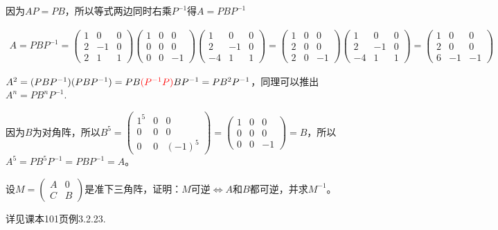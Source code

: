 \documentclass[a4paper]{report}
\begin{document}
\begin{jie}
因为$AP=PB$，所以等式两边同时右乘$P^{-1}$得$A=PBP^{-1}$

\begin{align*}
A=PBP^{-1}=
\begin{pmatrix}
1&0&0\\
2&-1&0\\
2&1&1
\end{pmatrix}
\begin{pmatrix}
1&0&0\\
0&0&0\\
0&0&-1
\end{pmatrix}
\begin{pmatrix}
1&0&0\\
2&-1&0\\
-4&1&1
\end{pmatrix}=
\begin{pmatrix}
1&0&0\\
2&0&0\\
2&0&-1
\end{pmatrix}
\begin{pmatrix}
1&0&0\\
2&-1&0\\
-4&1&1
\end{pmatrix}=
\begin{pmatrix}
1&0&0\\
2&0&0\\
6&-1&-1
\end{pmatrix}
\end{align*}

$A^2=
(PBP^{-1})(PBP^{-1})=PB\textcolor[rgb]{1.00,0.00,0.00}{(P^{-1}P)}BP^{-1}=PB^2P^{-1}
$，同理可以推出$A^n=PB^nP^{-1}$.

因为$B$为对角阵，所以$B^5
=\begin{pmatrix}
1^5&0&0\\
0&0&0\\
0&0&(-1)^5
 \end{pmatrix}=
 \begin{pmatrix}
 1&0&0\\
0&0&0\\
0&0&-1
 \end{pmatrix}=B
$，所以$A^5=PB^5P^{-1}=PBP^{-1}=A$。
\end{jie}

\EX 设$M=
\begin{pmatrix}
A&0\\
C&B
\end{pmatrix}
$是准下三角阵，证明：$M$可逆$\Leftrightarrow A$和$B$都可逆，并求$M^{-1}$。

\begin{zhengming}
详见课本101页例3.2.23.
\end{zhengming}
\end{document}
